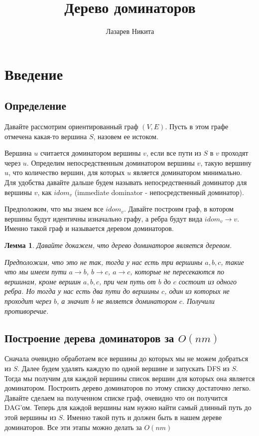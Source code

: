 \documentclass[a4paper, fontsize=12pt]{article}
\title{Дерево доминаторов}
\author{Лазарев Никита}
\begin{document}
\maketitle

\newtheorem{theorem}{Лемма} %

\section{Введение}

\subsection{Определение}

Давайте рассмотрим ориентированный граф $(V, E)$. Пусть в этом графе отмечена какая-то вершина $S$, назовем ее истоком. 

Вершина $u$ считается доминатором вершины $v$, если все пути из $S$ в $v$ проходят через $u$. Определим непосредственным доминатором вершины $v$, такую вершину $u$, что количество вершин, для которых $u$ является доминатором минимально. Для удобства давайте дальше будем называть непосредственный доминатор для вершины $v$, как $idom_v$ (immediate dominator - непосредственный доминатор).

Предположим, что мы знаем все $idom_v$. Давайте построим граф, в котором вершины будут идентичны изначально графу, а ребра будут вида $idom_v \rightarrow v$. Именно такой граф и называется деревом доминаторов.

 
\begin{theorem} \label{t1}
Давайте докажем, что дерево доминаторов является деревом.

Предположим, что это не так, тогда у нас есть три вершины $a, b, c$, такие что мы имеем пути $a \rightarrow b$, $b \rightarrow c$, $a \rightarrow c$, которые не пересекаются по вершинам, кроме вершин $a, b, c$, при чем путь от $b$ до $c$ состоит из одного ребра. Но тогда у нас есть два пути до вершины $c$, один из которых не проходит через $b$, а значит $b$ не является доминатором $c$. Получили противоречие.
\end{theorem}

\subsection{Построение дерева доминаторов за $O(nm)$}

Сначала очевидно обработаем все вершины до которых мы не можем добраться из $S$. Далее будем удалять каждую по одной вершине и запускать DFS из $S$. Тогда мы получим для каждой вершины список вершин для которых она является доминатором. Построить дерево доминаторов по этому списку достаточно легко. Давайте сделаем на полученном списке граф, очевидно что он получится DAG'ом. Теперь для каждой вершины нам нужно найти самый длинный путь до этой вершины из $S$. Именно такой путь и должен быть в нашем дереве доминаторов. Все эти этапы можно делать за $O(nm)$ 
\end{document}
